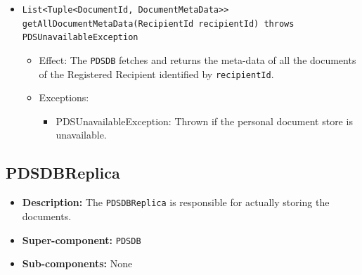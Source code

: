 \documentclass[a4paper,10pt]{article}
\begin{document}
\begin{itemize}
\begin{itemize}
         \item \texttt{List<Tuple<DocumentId, DocumentMetaData>> getAllDocumentMetaData(RecipientId recipientId) throws PDSUnavailableException}
        \begin{itemize}
            \item Effect: The \texttt{PDSDB} fetches and returns the meta-data of all the documents of the Registered Recipient identified by \texttt{recipientId}.
            \item Exceptions:
            \begin{itemize}
                \item PDSUnavailableException: Thrown if the personal document store is unavailable.
            \end{itemize}
		\end{itemize}
    \end{itemize}
\end{itemize}

\subsection{PDSDBReplica}
\begin{itemize}
    \item \textbf{Description:} The \texttt{PDSDBReplica} is responsible for actually storing the documents.
    \item \textbf{Super-component:} \texttt{PDSDB}
    \item \textbf{Sub-components:} None
\end{itemize}
\end{document}
